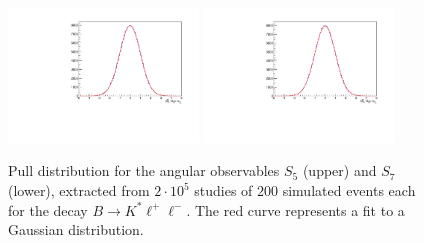 \documentclass[aps,nofootinbib,preprintnumbers,prd,twocolumn]{revtex4-1}
\begin{document}
\begin{figure}[b]
        \centering
            \includegraphics[width=0.45\textwidth]{figs/Q2_5_6_S5_200.pdf}
            \includegraphics[width=0.45\textwidth]{figs/Q2_5_6_S9_200.pdf}
        \caption{Pull distribution for the angular observables $S_5$ (upper) and $S_7$ (lower), extracted from $2\cdot 10^5$ studies of
        $200$ simulated events each for the decay $B\to K^*\ell^+\ell^-$. The red curve represents a fit to a Gaussian distribution.}
        \label{fig:pulls}
\end{figure}
\end{document}
